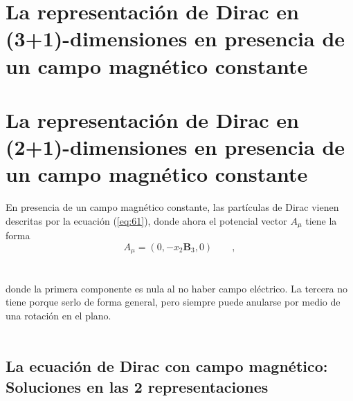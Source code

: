 \documentclass[11pt,letterpaper]{article}     %
\begin{document}
\newpage


\section{La representación de Dirac en (3+1)-dimensiones en presencia de un campo magnético constante}








\newpage
\section{La representación de Dirac en (2+1)-dimensiones en presencia de un campo magnético constante}






En presencia de un campo magnético constante, las partículas de Dirac vienen descritas por la ecuación (\ref{eq:61}), donde ahora el potencial vector $A_\mu$ tiene la forma
\begin{equation}\label{eq:137}
A_\mu=(0,-x_2 \textbf{B}_3,0) \qquad,
\end{equation} \\ \\
donde la primera componente es nula al no haber campo eléctrico. La tercera no tiene porque serlo de forma general, pero siempre puede anularse por medio de una rotación en el plano. \\ \\







\subsection{La ecuación de Dirac con campo magnético: Soluciones en las 2 representaciones}
\end{document}
